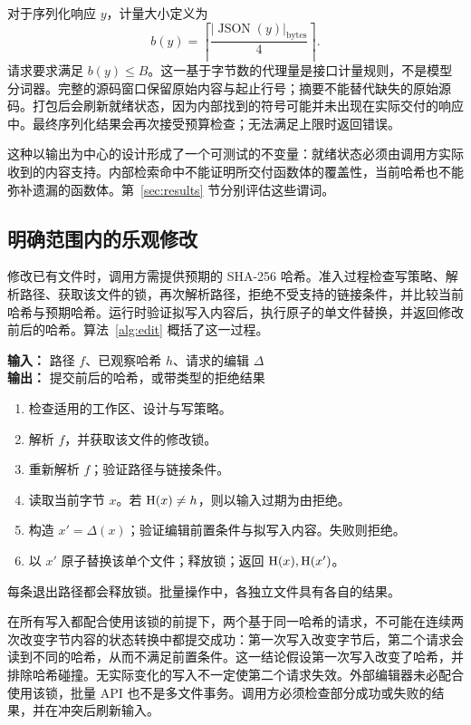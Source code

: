 对于序列化响应 $y$，计量大小定义为
\begin{equation}
 b(y)=\left\lceil\frac{|\operatorname{JSON}(y)|_{\mathrm{bytes}}}{4}\right\rceil.
 \label{eq:budget}
\end{equation}
请求要求满足 $b(y)\le B$。这一基于字节数的代理量是接口计量规则，不是模型分词器。完整的源码窗口保留原始内容与起止行号；摘要不能替代缺失的原始源码。打包后会刷新就绪状态，因为内部找到的符号可能并未出现在实际交付的响应中。最终序列化结果会再次接受预算检查；无法满足上限时返回错误。

这种以输出为中心的设计形成了一个可测试的不变量：就绪状态必须由调用方实际收到的内容支持。内部检索命中不能证明所交付函数体的覆盖性，当前哈希也不能弥补遗漏的函数体。第~\ref{sec:results} 节分别评估这些谓词。

\subsection{明确范围内的乐观修改}
修改已有文件时，调用方需提供预期的 SHA-256 哈希。准入过程检查写策略、解析路径、获取该文件的锁，再次解析路径，拒绝不受支持的链接条件，并比较当前哈希与预期哈希。运行时验证拟写入内容后，执行原子的单文件替换，并返回修改前后的哈希。算法~\ref{alg:edit} 概括了这一过程。

\begin{algorithm}[t]
\small
\caption{受保护编辑的准入过程（契约抽象）}
\label{alg:edit}
\textbf{输入：} 路径 $f$、已观察哈希 $h$、请求的编辑 $\Delta$\\
\textbf{输出：} 提交前后的哈希，或带类型的拒绝结果
\begin{enumerate}[label=\arabic*.,leftmargin=1.6em]
\item 检查适用的工作区、设计与写策略。
\item 解析 $f$，并获取该文件的修改锁。
\item 重新解析 $f$；验证路径与链接条件。
\item 读取当前字节 $x$。若 $\operatorname{H}(x)\ne h$，则以输入过期为由拒绝。
\item 构造 $x'=\Delta(x)$；验证编辑前置条件与拟写入内容。失败则拒绝。
\item 以 $x'$ 原子替换该单个文件；释放锁；返回 $\operatorname{H}(x),\operatorname{H}(x')$。
\end{enumerate}
每条退出路径都会释放锁。批量操作中，各独立文件具有各自的结果。
\end{algorithm}

在所有写入都配合使用该锁的前提下，两个基于同一哈希的请求，不可能在连续两次改变字节内容的状态转换中都提交成功：第一次写入改变字节后，第二个请求会读到不同的哈希，从而不满足前置条件。这一结论假设第一次写入改变了哈希，并排除哈希碰撞。无实际变化的写入不一定使第二个请求失效。外部编辑器未必配合使用该锁，批量 API 也不是多文件事务。调用方必须检查部分成功或失败的结果，并在冲突后刷新输入。

